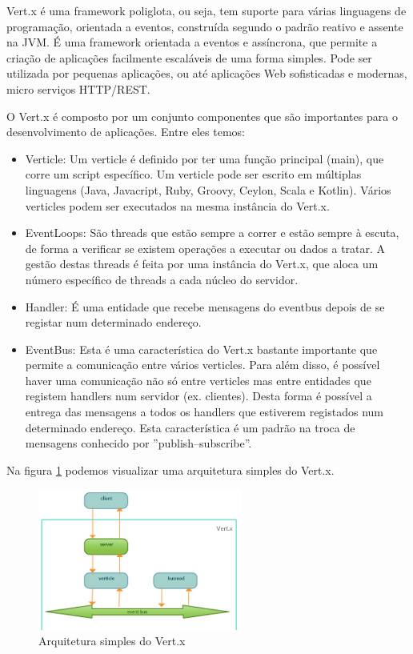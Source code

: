 Vert.x é uma framework poliglota, ou seja, tem suporte para várias linguagens de programação, orientada a eventos, construída segundo o padrão reativo e assente na \gls{JVM}. É uma framework orientada a eventos e assíncrona, que permite a criação de aplicações facilmente escaláveis de uma forma simples. Pode ser utilizada por pequenas aplicações, ou até aplicações Web sofisticadas e modernas, micro serviços \gls{HTTP}/\gls{REST}.\cite{vertx-io}

O Vert.x é composto por um conjunto componentes que são importantes para o desenvolvimento de aplicações. Entre eles temos: 

\begin{itemize}
  \item Verticle: Um verticle é definido por ter uma função principal (main), que corre um script específico. Um verticle pode ser escrito em múltiplas linguagens (Java, Javacript, Ruby, Groovy, Ceylon, Scala e Kotlin). Vários verticles podem ser executados na mesma instância do Vert.x.
  \item EventLoops: São threads que estão sempre a correr e estão sempre à escuta, de forma a verificar se existem operações a executar ou dados a tratar. A gestão destas threads é feita por uma instância do Vert.x, que aloca um número específico de threads a cada núcleo do servidor.
  \item Handler: É uma entidade que recebe mensagens do eventbus depois de se registar num determinado endereço.
  \item EventBus: Esta é uma característica do Vert.x bastante importante que permite a comunicação entre vários verticles. Para além disso, é possível haver uma comunicação não só entre verticles mas entre entidades que registem handlers num servidor (ex. clientes). Desta forma é possível a entrega das mensagens a todos os handlers que estiverem registados num determinado endereço. Esta característica é um padrão na troca de mensagens conhecido por ''publish–subscribe''.
\end{itemize}

Na figura \ref{f:vertxarch} podemos visualizar uma arquitetura simples do Vert.x. \cite{vertx-study}

\begin{figure}[H]
  \centering
  \includegraphics[width=0.6\textwidth]{imgs/vertx_arch.png}
  \caption[Arquitetura simples do Vert.x]{Arquitetura simples do Vert.x \cite{vertx-study}}
  \label{f:vertxarch}
\end{figure}


